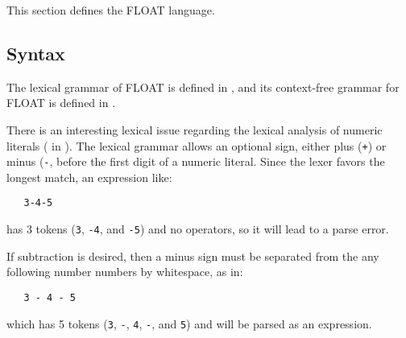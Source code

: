 \documentclass[11pt]{article}
\begin{document}
\label{sec:FLOAT}
This section defines the FLOAT language.

\subsection{Syntax}

The lexical grammar of FLOAT is defined in
,
and its context-free grammar for FLOAT is defined in .

There is an interesting lexical issue regarding the lexical analysis
of numeric literals ( in ).
The lexical grammar allows an optional sign,
either plus (\texttt{+}) or minus (\texttt{-},
before the first digit of a numeric literal.
Since the lexer favors the longest match, an expression like:

\begin{lstlisting}
   3-4-5
\end{lstlisting}

\noindent
has 3 tokens (\texttt{3}, \texttt{-4}, and \texttt{-5}) and no
operators, so it will lead to a parse error.

If subtraction is desired, then a minus sign must be separated from
the any following number numbers by whitespace, as in:

\begin{lstlisting}
   3 - 4 - 5
\end{lstlisting}

\noindent
which has 5 tokens (\texttt{3}, \texttt{-}, \texttt{4}, \texttt{-},
and \texttt{5}) and will be parsed as an expression.
\end{document}
